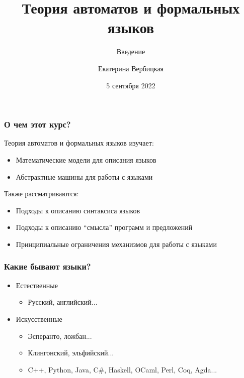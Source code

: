 \documentclass{beamer}
\title[]{Теория автоматов и формальных языков}
\subtitle[]{Введение}
\institute[]{
НИУ-ВШЭ\\
}
\author[]{Екатерина Вербицкая}
\date{5 сентября 2022}
\begin{document}
{
  \begin{frame}
    \titlepage
  \end{frame}
}

\begin{frame}[fragile]
  \transwipe[direction=90]
  \frametitle{О чем этот курс?}
  Теория автоматов и формальных языков изучает:
  \begin{itemize}
    \item Математические модели для описания языков
    \item Абстрактные машины для работы с языками
  \end{itemize}

  Также рассматриваются:
  \begin{itemize}
    \item Подходы к описанию синтаксиса языков
    \item Подходы к описанию ``смысла'' программ и предложений
    \item Принципиальные ограничения механизмов для работы с языками
  \end{itemize}
\end{frame}

\begin{frame}[fragile]
  \transwipe[direction=90]
  \frametitle{Какие бывают языки?}
  \pause
  \begin{itemize}
    \item Естественные
    \begin{itemize}
      \item Русский, английский...
    \end{itemize}
    \pause
    \item Искусственные
    \begin{itemize}
      \item Эсперанто, ложбан...
      \item Клингонский, эльфийский...
      \pause
      \item C++, Python, Java, C\#, Haskell, OCaml, Perl, Coq, Agda...
    \end{itemize}
  \end{itemize}
\end{frame}
\end{document}
